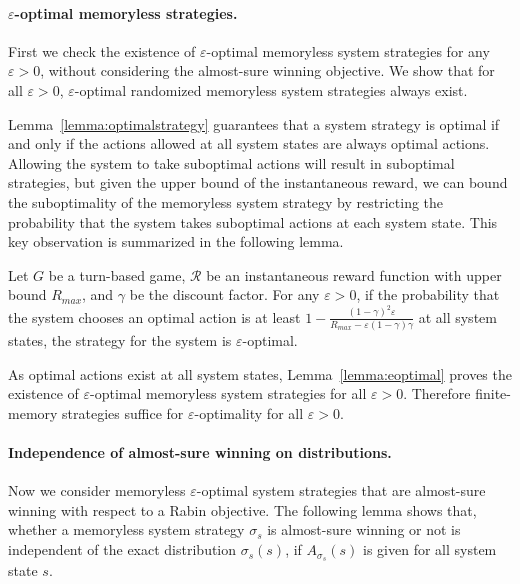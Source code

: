 \documentclass[runningheads,a4paper]{llncs}
\begin{document}
\paragraph{$\varepsilon$-optimal memoryless strategies.}
First we check the existence of $\varepsilon$-optimal memoryless system strategies for any $\varepsilon > 0$, without considering the almost-sure winning objective. 
We show that for all $\varepsilon > 0$, $\varepsilon$-optimal randomized memoryless system strategies always exist. 



Lemma~\ref{lemma:optimalstrategy} guarantees that a system strategy is optimal if and only if the actions allowed at all system states are always optimal actions. Allowing the system to take suboptimal actions will result in suboptimal strategies, but given the upper bound of the instantaneous reward, we can bound the suboptimality of the memoryless system strategy by restricting the probability that the system takes suboptimal actions at each system state. This key observation is summarized in the following lemma. 


\begin{lemma}
Let $G$ be a turn-based game, $\mathcal{R}$ be an instantaneous reward function with upper bound $R_{max}$, and $\gamma$ be the discount factor. For any $\varepsilon > 0$, if the probability that the system chooses an optimal action is at least $1 - \frac{(1-\gamma)^2 \varepsilon}{R_{max} - \varepsilon(1-\gamma)\gamma}$ at all system states, the strategy for the system is $\varepsilon$-optimal.
\label{lemma:eoptimal}
\end{lemma}

As optimal actions exist at all system states, Lemma~\ref{lemma:eoptimal} proves the existence of $\varepsilon$-optimal memoryless system strategies for all $\varepsilon > 0$. Therefore finite-memory strategies suffice for $\varepsilon$-optimality for all $\varepsilon > 0$. 



\paragraph{Independence of almost-sure winning on distributions.}


Now we consider memoryless $\varepsilon$-optimal system strategies that are almost-sure winning with respect to a Rabin objective. 
The following lemma shows that, whether a memoryless system strategy $\sigma_s$ is almost-sure winning or not is independent of the exact distribution $\sigma_s(s)$, if $A_{\sigma_s}(s)$ is given for all system state $s$. 
\end{document}
